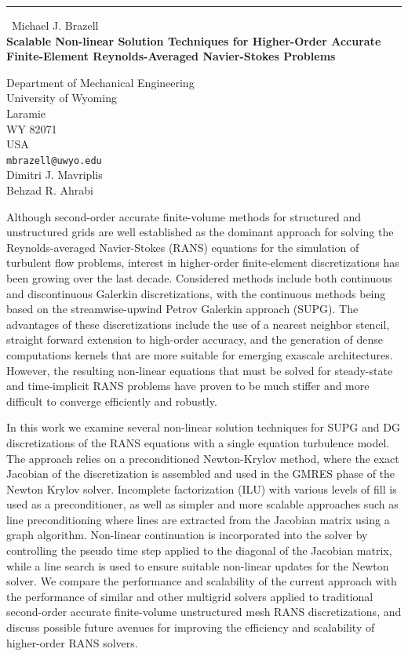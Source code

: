 \documentclass{report}
\begin{document}
\begin{center}
\rule{6in}{1pt} \
{\large Michael J. Brazell \\
{\bf Scalable Non-linear Solution Techniques for Higher-Order Accurate Finite-Element Reynolds-Averaged Navier-Stokes Problems}}

Department of Mechanical Engineering \\ University of Wyoming \\ Laramie \\ WY 82071 \\ USA
\\
{\tt mbrazell@uwyo.edu}\\
Dimitri J. Mavriplis\\
Behzad R. Ahrabi\end{center}

Although second-order accurate finite-volume methods for structured and
unstructured grids are well established as the dominant approach for
solving the Reynolds-averaged Navier-Stokes (RANS) equations for the
simulation of turbulent flow problems, interest in higher-order
finite-element discretizations has been growing over the last decade.
Considered methods include both continuous and discontinuous Galerkin
discretizations, with the continuous methods being based on the
streamwise-upwind Petrov Galerkin approach (SUPG). The advantages of
these discretizations include the use of a nearest neighbor stencil,
straight forward extension to high-order accuracy, and the generation of
dense computations kernels that are more suitable for emerging exascale
architectures. However, the resulting non-linear equations that must be
solved for steady-state and time-implicit RANS problems have proven to be
much stiffer and more difficult to converge efficiently and robustly.

In this work we examine several non-linear solution techniques for SUPG
and DG discretizations of the RANS equations with a single equation
turbulence model. The approach relies on a preconditioned Newton-Krylov
method, where the exact Jacobian of the discretization is assembled and
used in the GMRES phase of the Newton Krylov solver. Incomplete
factorization (ILU) with various levels of fill is used as a
preconditioner, as well as simpler and more scalable approaches such as
line preconditioning where lines are extracted from the Jacobian matrix
using a graph algorithm. Non-linear continuation is incorporated into the
solver by controlling the pseudo time step applied to the diagonal of the
Jacobian matrix, while a line search is used to ensure suitable
non-linear updates for the Newton solver. We compare the performance and
scalability of the current approach with the performance of similar and
other multigrid solvers applied to traditional second-order accurate
finite-volume unstructured mesh RANS discretizations, and discuss
possible future avenues for improving the efficiency and scalability of
higher-order RANS solvers.
\end{document}
